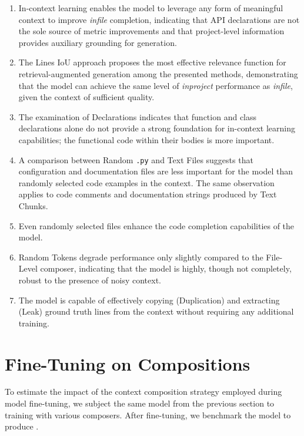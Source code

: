 \begin{enumerate}
\item In-context learning enables the model to leverage any form of meaningful context to improve \textit{infile} completion, indicating that API declarations are not the sole source of metric improvements and that project-level information provides auxiliary grounding for generation.
\item The Lines IoU approach proposes the most effective relevance function for retrieval-augmented generation among the presented methods, demonstrating that the model can achieve the same level of \textit{inproject} performance as \textit{infile}, given the context of sufficient quality.
\item The examination of Declarations indicates that function and class declarations alone do not provide a strong foundation for in-context learning capabilities; the functional code within their bodies is more important.
\item A comparison between Random \texttt{.py} and Text Files suggests that configuration and documentation files are less important for the model than randomly selected code examples in the context. The same observation applies to code comments and documentation strings produced by Text Chunks.
\item Even randomly selected files enhance the code completion capabilities of the model.
\item Random Tokens degrade performance only slightly compared to the File-Level composer, indicating that the model is highly, though not completely, robust to the presence of noisy context.
\item The model is capable of effectively copying (Duplication) and extracting (Leak) ground truth lines from the context without requiring any additional training.
\end{enumerate}

\section{Fine-Tuning on Compositions}\label{sec:fine-tuning-on-compositions}

To estimate the impact of the context composition strategy employed during model fine-tuning, we subject the same model from the previous section to training with various composers. After fine-tuning, we benchmark the model to produce .

